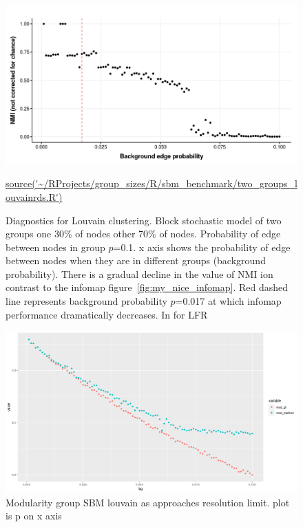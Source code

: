 

\begin{figure}
    \centering
    \includegraphics[width=\textwidth]{images/chaptercommunity/ggplot2/sbm_benchmark/Rplot_NMI_louvain.png}
    \caption{Diagnostics for Louvain clustering. Block stochastic model of two groups one 30\% of nodes other 70\% of nodes. Probability of edge between nodes in group $p$=0.1. x axis shows the probability of edge between nodes when they are in different groups (background probability). There is a gradual decline in the value of NMI ion contrast to the infomap figure~\ref{fig:my_nice_infomap}. Red dashed line represents background probability $p$=0.017 at which infomap performance dramatically decreases. In \cite{yang2016comparative} for LFR}
    \tiny\url{source('~/RProjects/group_sizes/R/sbm_benchmark/two_groups_louvainrds.R')}
    \label{fig:my_sbmlouvain_nmi}
\end{figure}



\begin{figure}
    \centering
    \includegraphics[width=\textwidth]{images/Rplot_rough_modularity_lou_ground_truth.png}
    \caption{Modularity group SBM louvain as approaches resolution limit. plot is p on x axis}
    \label{fig:my_rough_louvain modularity}
\end{figure}

